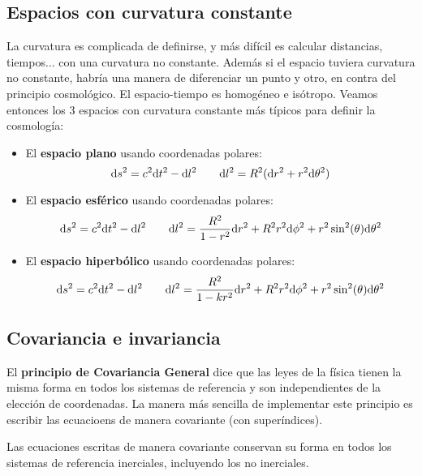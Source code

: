 \subsection{Espacios con curvatura constante}

La curvatura es complicada de definirse, y más difícil es calcular distancias, tiempos... con una curvatura no constante. Además si el espacio tuviera curvatura no constante, habría una manera de diferenciar un punto y otro, en contra del principio cosmológico. El espacio-tiempo es homogéneo e isótropo. Veamos entonces los 3 espacios con curvatura constante más típicos para definir la cosmología:

\begin{itemize}
	\item El \textbf{espacio plano} usando coordenadas polares:
	      \begin{equation}
		      \mathrm{d} s^2 = c^2 \mathrm{d} t^2 - \mathrm{d} l^2 \qquad \mathrm{d} l^2  = R^2 (\mathrm{d} r^2 + r^2 \mathrm{d} \theta^2 )
	      \end{equation}
	\item El \textbf{espacio esférico} usando coordenadas polares:
	      \begin{equation}
		      \mathrm{d} s^2 = c^2 \mathrm{d} t^2 - \mathrm{d} l^2 \qquad \mathrm{d} l^2 = \frac{R^2}{1-r^2}\mathrm{d} r^2 +R^2 r^2 \mathrm{d} \phi^2 + r^2 \sin^2 (\theta) \mathrm{d} \theta^2
	      \end{equation}
	\item El \textbf{espacio hiperbólico} usando coordenadas polares:
	      \begin{equation}
		      \mathrm{d} s^2 = c^2 \mathrm{d} t^2 - \mathrm{d} l^2 \qquad \mathrm{d} l^2 = \frac{R^2}{1-kr^2}\mathrm{d} r^2 +R^2 r^2 \mathrm{d} \phi^2 + r^2 \sin^2 (\theta) \mathrm{d} \theta^2
	      \end{equation}
\end{itemize}

\subsection{Covariancia e invariancia}

El \textbf{principio de Covariancia General} dice que las leyes de la física tienen la misma forma en todos los sistemas de referencia y son independientes de la elección de coordenadas. La manera más sencilla de implementar este principio es escribir las ecuacioens de manera covariante (con superíndices).

Las ecuaciones escritas de manera covariante conservan su forma en todos los sistemas de referencia inerciales, incluyendo los no inerciales.

